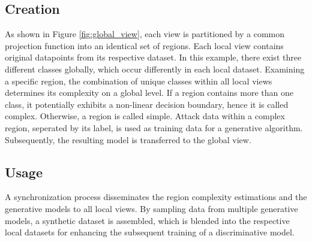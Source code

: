 \subsection{Creation}
As shown in Figure \ref{fig:global_view}, each view is partitioned by a common projection function into an identical set of regions. Each local view contains original datapoints from its respective dataset. In this example, there exist three different classes globally, which occur differently in each local dataset. Examining a specific region, the combination of unique classes within all local views determines its complexity on a global level. If a region contains more than one class, it potentially exhibits a non-linear decision boundary, hence it is called complex. Otherwise, a region is called simple. Attack data within a complex region, seperated by its label, is used as training data for a generative algorithm. Subsequently, the resulting model is transferred to the global view. 

\subsection{Usage}
A synchronization process disseminates the region complexity estimations and the generative models to all local views. By sampling data from multiple generative models, a synthetic dataset is assembled, which is blended into the respective local datasets for enhancing the subsequent training of a discriminative model.